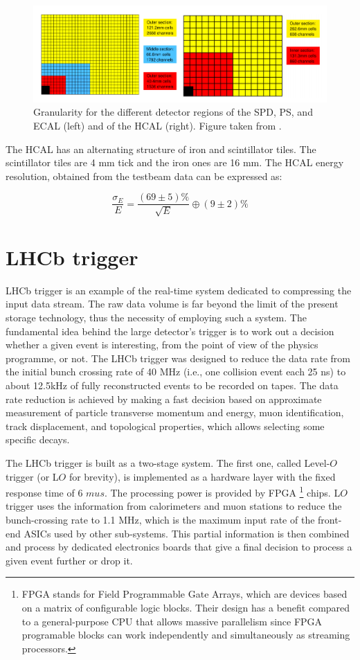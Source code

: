 \begin{figure}
\centering
\includegraphics[width=\linewidth]{figures/ECAL.PNG}
\caption{Granularity for the different detector regions of the SPD, PS, and ECAL (left)
and of the HCAL (right). Figure taken from \cite{lhcb}.
\label{fig:ECAL}}
\end{figure}

The HCAL has an alternating structure of iron and scintillator tiles. The scintillator tiles are 4 mm tick and the iron ones are 16 mm. The HCAL energy resolution, obtained from the testbeam data can be expressed as: 

\begin{equation}
    \frac{\sigma_E}{E} = \frac{(69\pm 5) \%}{\sqrt{E}} \oplus (9\pm 2) \%
\end{equation}
 
\section{LHCb trigger}
\label{sec:trigger}
LHCb trigger is an example of the real-time system dedicated to compressing the input data stream. The raw data volume is far beyond the limit of the present storage technology, thus the necessity of employing such a system. The fundamental idea behind the large detector's trigger is to work out a decision whether a given event is interesting, from the point of view of the physics programme, or not. The LHCb trigger was designed to reduce the data rate from the initial bunch crossing rate of 40 MHz (i.e., one collision event each 25 ns) to about 12.5kHz of fully reconstructed events to be recorded on tapes. The data rate reduction is achieved by making a fast decision based on approximate measurement of particle transverse momentum and energy, muon identification, track displacement, and topological properties, which allows selecting some specific decays. 

The LHCb trigger is built as a two-stage system. The first one, called Level-$O$ trigger (or L$O$ for brevity), is implemented as a hardware layer with the fixed response time of 6 $mu s$. The processing power is provided by FPGA \footnote{FPGA stands for Field Programmable Gate Arrays, which are devices based on a matrix of configurable logic blocks. Their design has a benefit compared to a general-purpose CPU that allows massive parallelism since FPGA programable blocks can work independently and simultaneously as streaming processors.} chips. L$O$ trigger uses the information from calorimeters and muon stations to reduce the bunch-crossing rate to 1.1 MHz, which is the maximum input rate of the front-end ASICs used by other sub-systems. This partial information is then combined and process by dedicated electronics boards that give a final decision to process a given event further or drop it. 

